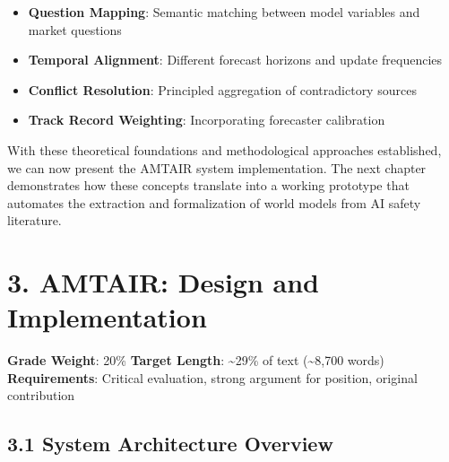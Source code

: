 \documentclass[
  11pt,
  letterpaper,
]{book}
\providecommand{\tightlist}{%
  \setlength{\itemsep}{0pt}\setlength{\parskip}{0pt}}
\begin{document}
\begin{itemize}
\tightlist
\item
  \textbf{Question Mapping}: Semantic matching between model variables
  and market questions
\item
  \textbf{Temporal Alignment}: Different forecast horizons and update
  frequencies
\item
  \textbf{Conflict Resolution}: Principled aggregation of contradictory
  sources
\item
  \textbf{Track Record Weighting}: Incorporating forecaster calibration
\end{itemize}

With these theoretical foundations and methodological approaches
established, we can now present the AMTAIR system implementation. The
next chapter demonstrates how these concepts translate into a working
prototype that automates the extraction and formalization of world
models from AI safety literature.


\chapter*{3. AMTAIR: Design and Implementation}\label{sec-amtair}


\begin{tcolorbox}[enhanced jigsaw, opacitybacktitle=0.6, colbacktitle=quarto-callout-note-color!10!white, toptitle=1mm, colback=white, breakable, left=2mm, bottomrule=.15mm, title=\textcolor{quarto-callout-note-color}{\faInfo}\hspace{0.5em}{Chapter Overview}, rightrule=.15mm, arc=.35mm, toprule=.15mm, opacityback=0, colframe=quarto-callout-note-color-frame, bottomtitle=1mm, titlerule=0mm, leftrule=.75mm, coltitle=black]

\textbf{Grade Weight}: 20\% \textbar{} \textbf{Target Length}:
\textasciitilde29\% of text (\textasciitilde8,700 words)\\
\textbf{Requirements}: Critical evaluation, strong argument for
position, original contribution

\end{tcolorbox}

\section*{3.1 System Architecture
Overview}\label{sec-system-architecture}
\end{document}
